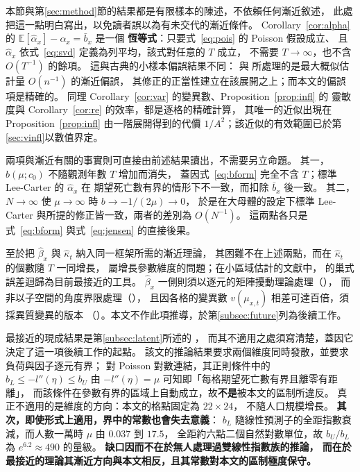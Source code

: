 \documentclass[UTF8, fontset=macnew, a4paper, 12pt]{ctexart}
\newcommand{\Ex}{\mathbb{E}}
\begin{document}
本節與第\ref{sec:method}節的結果都是有限樣本的陳述，不依賴任何漸近敘述，
此處把這一點明白寫出，以免讀者誤以為有未交代的漸近條件。
Corollary~\ref{cor:alpha} 的 $\Ex[\hat\alpha_x]-\alpha_x=\bar b_x$ 是一個
\textbf{恆等式}：只要式~\eqref{eq:pois} 的 Poisson 假設成立、
且 $\hat\alpha_x$ 依式~\eqref{eq:svd} 定義為列平均，該式對任意的 $T$ 成立，
不需要 $T\to\infty$，也不含 $O(T^{-1})$ 的餘項。
這與古典的小樣本偏誤結果不同：\citet{coxsnell1968} 與 \citet{firth1993}
所處理的是最大概似估計量 $O(n^{-1})$ 的漸近偏誤，
其修正的正當性建立在該展開之上；而本文的偏誤項是精確的。
同理 Corollary~\ref{cor:var} 的變異數、Proposition~\ref{prop:infl} 的
靈敏度與 Corollary~\ref{cor:re} 的效率，都是逐格的精確計算，
其唯一的近似出現在 Proposition~\ref{prop:infl} 由一階展開得到的代價
$1/A^2$；該近似的有效範圍已於第\ref{sec:vinfl}以數值界定。

兩項與漸近有關的事實則可直接由前述結果讀出，不需要另立命題。
其一，$b(\mu;c_0)$ 不隨觀測年數 $T$ 增加而消失，
蓋因式~\eqref{eq:bform} 完全不含 $T$；標準 Lee-Carter 的 $\hat\alpha_x$ 在
期望死亡數有界的情形下不一致，而扣除 $\bar b_x$ 後一致。
其二，$N\to\infty$ 使 $\mu\to\infty$ 時 $b\to-1/(2\mu)\to0$，
於是在大母體的設定下標準 Lee-Carter 與所提的修正皆一致，兩者的差別為 $O(N^{-1})$。
這兩點各只是式~\eqref{eq:bform} 與式~\eqref{eq:jensen} 的直接後果。

至於把 $\hat\beta_x$ 與 $\hat\kappa_t$ 納入同一框架所需的漸近理論，
其困難不在上述兩點，而在 $\hat\kappa_t$ 的個數隨 $T$ 一同增長，
屬增長參數維度的問題；在小區域估計的文獻中，
\citet{lahiri2023} 的巢式誤差迴歸為目前最接近的工具。
$\hat\beta_x$ 一側則須以逐元的矩陣擾動理論處理（\citealp{abbe2020}），
而非以子空間的角度界限處理（\citealp{caizhang2018}），
且因各格的變異數 $v(\mu_{x,t})$ 相差可達百倍，須採異質變異的版本
（\citealp{zhang2022}）。本文不作此項推導，於第\ref{subsec:future}列為後續工作。

最接近的現成結果是第\ref{subsec:latent}所述的 \citet{cuixu2026}，
而其不適用之處須寫清楚，蓋因它決定了這一項後續工作的起點。
該文的推論結果要求兩個維度同時發散，並要求負荷與因子逐元有界；
對 Poisson 對數連結，其正則條件中的 $b_L\le-l''(\eta)\le b_U$
由 $-l''(\eta)=\mu$ 可知即「每格期望死亡數有界且離零有距離」，
而該條件在參數有界的區域上自動成立，故\textbf{不是}被本文的區制所違反。
真正不適用的是維度的方向：本文的格點固定為 $22\times24$，
不隨人口規模增長。
\textbf{其次，即使形式上適用，界中的常數也會失去意義}：
$b_L$ 隨線性預測子的全距指數衰減，而人數一萬時 $\mu$ 由 $0.037$ 到 $17.5$，
全距約六點二個自然對數單位，故 $b_U/b_L$ 為 $e^{6.2}\approx490$ 的量級。
\textbf{缺口因而不在於無人處理過雙線性指數族的推論，
而在於最接近的理論其漸近方向與本文相反，且其常數對本文的區制極度保守。}
\end{document}
